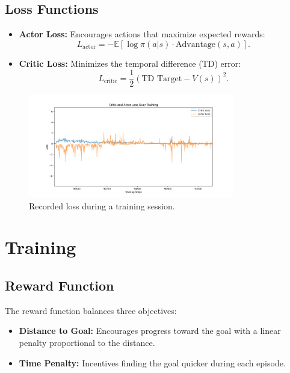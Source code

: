 \documentclass[12pt]{article}
\begin{document}
\subsection{Loss Functions}
\begin{itemize}
    \item \textbf{Actor Loss:} Encourages actions that maximize expected rewards:
    \[
    L_\text{actor} = -\mathbb{E}[\log\pi(a|s) \cdot \text{Advantage}(s, a)].
    \]
    \item \textbf{Critic Loss:} Minimizes the temporal difference (TD) error:
    \[
    L_\text{critic} = \frac{1}{2} (\text{TD Target} - V(s))^2.
    \]
\end{itemize}

\begin{figure}[H]
    \centering
    \includegraphics[width=0.8\textwidth]{report/images/loss.png}
    \caption{Recorded loss during a training session.}
    \label{fig:trajectory}
\end{figure}

\section{Training}

\subsection{Reward Function}
The reward function balances three objectives:
\begin{itemize}
    \item \textbf{Distance to Goal:} Encourages progress toward the goal with a linear penalty proportional to the distance.
    \item \textbf{Time Penalty:} Incentives finding the goal quicker during each episode. 
\end{itemize}
\end{document}
